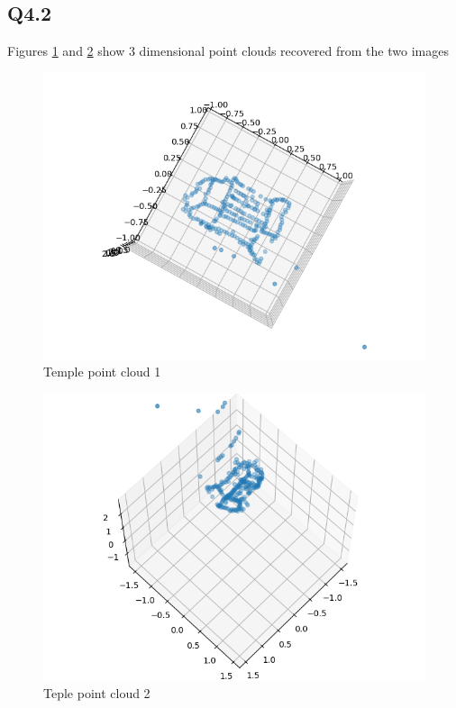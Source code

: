 \documentclass[12pt]{article}
\begin{document}
\subsection{Q4.2}
Figures \ref{fig:3d1} and \ref{fig:3d2} show 3 dimensional point clouds recovered from the two images
\begin{figure}[H]
\centering
\includegraphics[page=1,width=1\textwidth]{q4_2a}
\caption{Temple point cloud 1 } 
\label{fig:3d1}
\end{figure}   

\begin{figure}[H]
\centering
\includegraphics[page=1,width=1\textwidth]{q4_2b}
\caption{Teple point cloud 2 } 
\label{fig:3d2}
\end{figure}   
\end{document}
